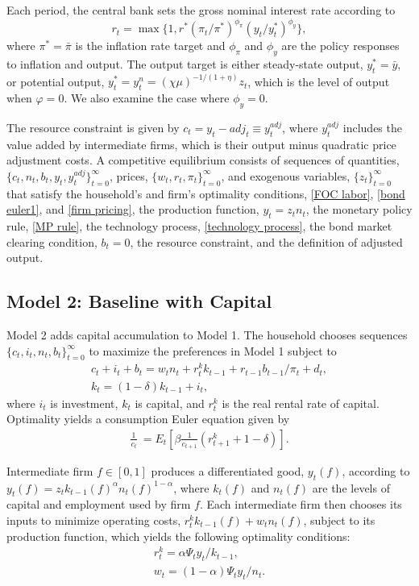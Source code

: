 \documentclass[12pt,final]{article}
\begin{document}
Each period, the central bank sets the gross nominal interest rate according to
\begin{equation}
  r_t=\max\{1,r^*(\pi_t/\pi^*)^{\phi_\pi}(y_t/y_t^*)^{\phi_y}\}, \label{MP rule}
\end{equation}
where $\pi^*=\bar{\pi}$ is the inflation rate target and $\phi_\pi$ and $\phi_y$ are the policy responses to inflation and output. The output target is either steady-state output, $y_t^*=\bar{y}$, or potential output, $y_t^*=y_t^n=(\chi\mu)^{-1/(1+\eta)}z_t$, which is the level of output when $\varphi=0$. We also examine the case where $\phi_{y}=0$.

The resource constraint is given by $c_t=y_t-adj_t\equiv y_t^{adj}$, where $y_t^{adj}$ includes the value added by intermediate firms, which is their output minus quadratic price adjustment costs. A competitive equilibrium consists of sequences of quantities, $\{c_t,n_t,b_t,y_t,y_t^{adj}\}_{t=0}^\infty$, prices, $\{w_t,r_t,\pi_t\}_{t=0}^\infty$, and exogenous variables, $\{z_t\}_{t=0}^\infty$ that satisfy the household's and firm's optimality conditions, \eqref{FOC labor}, \eqref{bond euler1}, and \eqref{firm pricing}, the production function, $y_t=z_tn_t$, the monetary policy rule, \eqref{MP rule}, the technology process, \eqref{technology process}, the bond market clearing condition, $b_t=0$, the resource constraint, and the definition of adjusted output.

\subsection{Model 2: Baseline with Capital}\label{sec:model2}

Model 2 adds capital accumulation to Model 1. The household chooses sequences $\{c_t,i_t,n_t,b_t\}_{t=0}^{\infty}$ to maximize the preferences in Model 1 subject to
\begin{gather}
  c_t+i_t+b_t=w_tn_t+r_t^kk_{t-1}+r_{t-1}b_{t-1}/\pi_t+d_t, \label{bc2}\\
  k_t=(1-\delta)k_{t-1}+i_t,  \label{inv2}
\end{gather}
where $i_t$ is investment, $k_t$ is capital, and $r_t^k$ is the real rental rate of capital. Optimality yields a consumption Euler equation given by
\begin{gather}
  \frac{1}{c_t}\ =E_t\left[\beta \frac{1}{c_{t+1}}\left(r_{t+1}^k  + 1-\delta \right)\right]. \label{FOC k}
\end{gather}

Intermediate firm $f\in[0,1]$ produces a differentiated good, $y_t(f)$, according to $y_t(f)=z_tk_{t-1}(f)^{\alpha}n_t(f)^{1-\alpha}$, where $k_t(f)$ and $n_t(f)$ are the levels of capital and employment used by firm $f$. Each intermediate firm then chooses its inputs to minimize operating costs, $r_t^kk_{t-1}(f)+w_tn_t(f)$, subject to its production function, which yields the following optimality conditions:
\begin{gather}
  r_t^k = \alpha \Psi_t y_t/k_{t-1}, \label{Firm capital FOC} \\
  w_t = (1 - \alpha)  \Psi_t y_t/n_t. \label{Firm labor FOC}
\end{gather}
\end{document}
